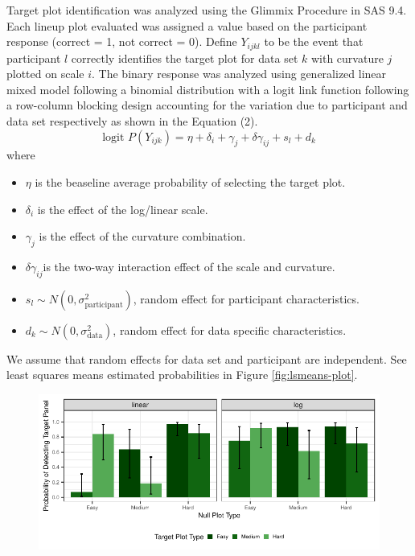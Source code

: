 \begin{appendix}
Target plot identification was analyzed using the Glimmix Procedure in
SAS 9.4. Each lineup plot evaluated was assigned a value based on the
participant response (correct = 1, not correct = 0). Define \(Y_{ijkl}\)
to be the event that participant \(l\) correctly identifies the target
plot for data set \(k\) with curvature \(j\) plotted on scale \(i\). The
binary response was analyzed using generalized linear mixed model
following a binomial distribution with a logit link function following a
row-column blocking design accounting for the variation due to
participant and data set respectively as shown in the Equation (2).
\begin{equation}
\text{logit }P(Y_{ijk}) = \eta + \delta_i + \gamma_j + \delta \gamma_{ij} + s_l + d_k
\end{equation} where

\begin{itemize}
\item $\eta$ is the beaseline average probability of selecting the target plot. 
\item $\delta_i$ is the effect of the log/linear scale.
\item $\gamma_j$ is the effect of the curvature combination.
\item $\delta\gamma_{ij}$is the two-way interaction effect of the scale and curvature.
\item $s_l \sim N(0,\sigma^2_\text{{participant}})$, random effect for participant characteristics.
\item $d_k \sim N(0,\sigma^2_{\text{data}})$, random effect for data specific characteristics. 
\end{itemize}

We assume that random effects for data set and participant are
independent. See least squares means estimated probabilities in Figure
\ref{fig:lsmeans-plot}.

\begin{figure}

{\centering \includegraphics[width=\columnwidth]{./images/lsmeans-plot-1} 

}
\end{figure}
\end{appendix}

